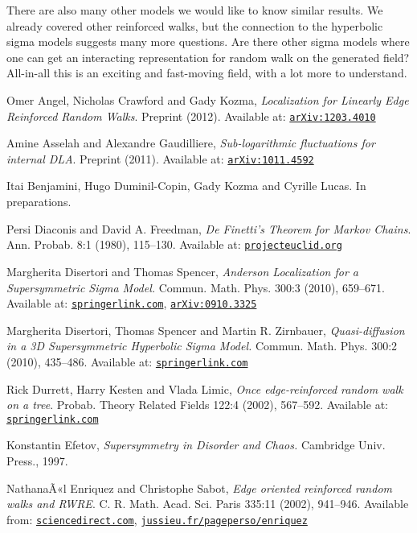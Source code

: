 \documentclass{emsprocart}
\theoremstyle{plain}
\begin{document}
There are also many other models we would like to know similar results.
We already covered other reinforced walks, but the connection to the
hyperbolic sigma models suggests many more questions. Are there other
sigma models where one can get an interacting representation for random
walk on the generated field? All-in-all this is an exciting and fast-moving
field, with a lot more to understand.
\begin{thebibliography}{10}
Omer Angel, Nicholas Crawford and Gady Kozma, \emph{Localization
for Linearly Edge Reinforced Random Walks}. Preprint (2012). Available
at: \href{http://arxiv.org/abs/1203.4010}{\nolinkurl{arXiv:1203.4010}}

Amine Asselah and Alexandre Gaudilliere, \emph{Sub-logarithmic
fluctuations for internal DLA}. Preprint (2011). Available at: \href{http://arxiv.org/abs/1011.4592}{\nolinkurl{arXiv:1011.4592}}

Itai Benjamini, Hugo Duminil-Copin, Gady Kozma and
Cyrille Lucas. In preparations.

Persi Diaconis and David A. Freedman, \emph{De Finetti's
Theorem for Markov Chains}. Ann. Probab. 8:1 (1980), 115--130. Available
at: \href{http://projecteuclid.org/euclid.aop/1176994828}{\nolinkurl{projecteuclid.org}}

 Margherita Disertori and Thomas Spencer, \textit{Anderson
Localization for a Supersymmetric Sigma Model.} Commun. Math. Phys.
300:3 (2010), 659--671. Available at: \href{http://www.springerlink.com/content/m6583504661746lj/}{\nolinkurl{springerlink.com}},
\href{http://arxiv.org/abs/0910.3325}{\nolinkurl{arXiv:0910.3325}}

 Margherita Disertori, Thomas Spencer and Martin R.
Zirnbauer, \textit{Quasi-diffusion in a 3D Supersymmetric Hyperbolic
Sigma Model.} Commun. Math. Phys. 300:2 (2010), 435--486. Available
at: \href{http://www.springerlink.com/content/61xj2m4860u40844/}{\nolinkurl{springerlink.com}}

Rick Durrett, Harry Kesten and Vlada Limic, \emph{Once
edge-reinforced random walk on a tree}. Probab. Theory Related Fields
122:4 (2002), 567--592. Available at: \href{http://www.springerlink.com/content/xw5b9462m2kwtf6j/}{\nolinkurl{springerlink.com}}

Konstantin Efetov, \textit{Supersymmetry in Disorder
and Chaos.} Cambridge Univ. Press., 1997.

NathanaÃ«l Enriquez and Christophe Sabot, \emph{Edge
oriented reinforced random walks and RWRE}. C. R. Math. Acad. Sci.
Paris 335:11 (2002), 941--946. Available from: \href{http://www.sciencedirect.com/science/article/pii/S1631073X02025803}{\nolinkurl{sciencedirect.com}},
\href{http://www.proba.jussieu.fr/pageperso/enriquez/PUB/CRAS.pdf}{\nolinkurl{jussieu.fr/pageperso/enriquez}} 


\end{thebibliography}
\end{document}
